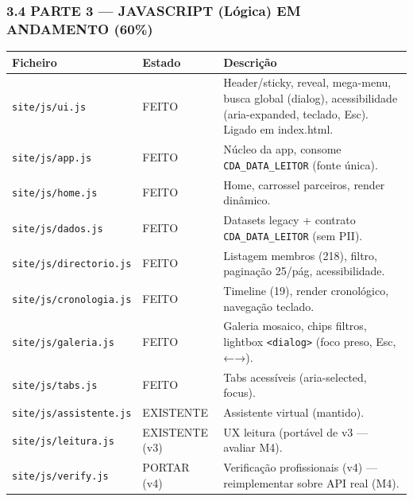 \subsubsection{\texorpdfstring{3.4 PARTE 3 --- JAVASCRIPT (Lógica) {EM
ANDAMENTO
(60\%)}}{3.4 PARTE 3 --- JAVASCRIPT (Lógica) EM ANDAMENTO (60\%)}}\label{parte-3-javascript-luxf3gica-em-andamento-60}

{\def\LTcaptype{none} %
\begin{longtable}[]{@{}
  >{\raggedright\arraybackslash}p{}
  >{\raggedright\arraybackslash}p{}
  >{\raggedright\arraybackslash}p{}@{}}
\toprule\noalign{}
\begin{minipage}[b]{\linewidth}\raggedright
Ficheiro
\end{minipage} & \begin{minipage}[b]{\linewidth}\raggedright
Estado
\end{minipage} & \begin{minipage}[b]{\linewidth}\raggedright
Descrição
\end{minipage} \\
\midrule\noalign{}
\endhead
\bottomrule\noalign{}
\endlastfoot
\texttt{site/js/ui.js} & {FEITO} & Header/sticky, reveal, mega-menu,
busca global (dialog), acessibilidade (aria-expanded, teclado, Esc).
Ligado em index.html. \\
\texttt{site/js/app.js} & {FEITO} & Núcleo da app, consome
\texttt{CDA\_DATA\_LEITOR} (fonte única). \\
\texttt{site/js/home.js} & {FEITO} & Home, carrossel parceiros, render
dinâmico. \\
\texttt{site/js/dados.js} & {FEITO} & Datasets legacy + contrato
\texttt{CDA\_DATA\_LEITOR} (sem PII). \\
\texttt{site/js/directorio.js} & {FEITO} & Listagem membros (218),
filtro, paginação 25/pág, acessibilidade. \\
\texttt{site/js/cronologia.js} & {FEITO} & Timeline (19), render
cronológico, navegação teclado. \\
\texttt{site/js/galeria.js} & {FEITO} & Galeria mosaico, chips filtros,
lightbox \texttt{\textless{}dialog\textgreater{}} (foco preso, Esc,
←→). \\
\texttt{site/js/tabs.js} & {FEITO} & Tabs acessíveis (aria-selected,
focus). \\
\texttt{site/js/assistente.js} & {EXISTENTE} & Assistente virtual
(mantido). \\
\texttt{site/js/leitura.js} & {EXISTENTE (v3)} & UX leitura (portável de
v3 --- avaliar M4). \\
\texttt{site/js/verify.js} & {PORTAR (v4)} & Verificação profissionais
(v4) --- reimplementar sobre API real (M4). \\
\end{longtable}
}

